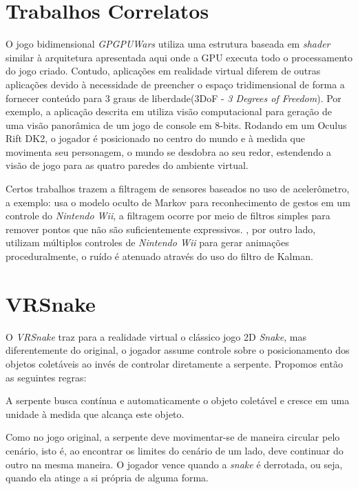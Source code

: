 \documentclass{vgtc}                          %
\begin{document}
\section{Trabalhos Correlatos} \label{sec:relatedworks}
O jogo bidimensional \textit{GPGPUWars} \cite{GPGPUWars} utiliza uma estrutura baseada em \textit{shader} similar à arquitetura apresentada aqui onde a GPU executa todo o processamento do jogo criado. Contudo, aplicações em realidade virtual diferem de outras aplicações devido à necessidade de preencher o espaço tridimensional de forma a fornecer conteúdo para 3 graus de liberdade(3DoF - \textit{3 Degrees of Freedom}). Por exemplo, a aplicação descrita em \cite{zund2015unfolding} utiliza visão computacional para geração de uma visão panorâmica de um jogo de console em 8-bits. Rodando em um Oculus Rift DK2, o jogador é posicionado no centro do mundo e à medida que movimenta seu personagem, o mundo se desdobra ao seu redor, estendendo a visão de jogo para as quatro paredes do ambiente virtual.

Certos trabalhos trazem a filtragem de sensores baseados no uso de acelerômetro, a exemplo: \cite{schlomer2008gesture} usa o modelo oculto de Markov para reconhecimento de gestos em um controle do \textit{Nintendo Wii}, a filtragem ocorre por meio de filtros simples para remover pontos que não são suficientemente expressivos. \cite{shiratori2008accelerometer}, por outro lado, utilizam múltiplos controles de \textit{Nintendo Wii} para gerar animações proceduralmente, o ruído é atenuado através do uso do filtro de Kalman.

\section{VRSnake} \label{sec:vrsnake}
O \textit{VRSnake} traz para a realidade virtual o clássico jogo 2D \textit{Snake}, mas diferentemente do original, o jogador assume controle sobre o posicionamento dos objetos coletáveis ao invés de controlar diretamente a serpente. Propomos então as seguintes regras: 

A serpente busca contínua e automaticamente o objeto coletável e cresce em uma unidade à medida que alcança este objeto.

Como no jogo original, a serpente deve movimentar-se de maneira circular pelo cenário, isto é, ao encontrar os limites do cenário de um lado, deve continuar do outro na mesma maneira. O jogador vence quando a \textit{snake} é derrotada, ou seja, quando ela atinge a si própria de alguma forma.
\end{document}
